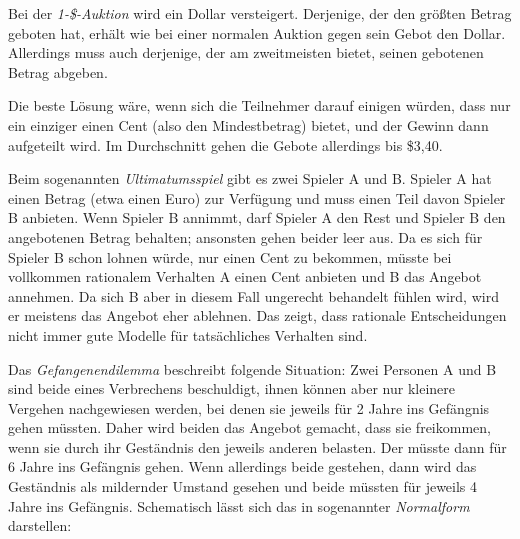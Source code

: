 \documentclass{zusammenfassung}
\begin{document}

Bei der \emph{1-\$-Auktion} wird ein Dollar versteigert. Derjenige, der den größten Betrag geboten hat, erhält wie bei einer 
normalen Auktion gegen sein Gebot den Dollar. Allerdings muss auch derjenige, der am zweitmeisten bietet, seinen gebotenen Betrag 
abgeben.

Die beste Lösung wäre, wenn sich die Teilnehmer darauf einigen würden, dass nur ein einziger einen Cent (also den Mindestbetrag)
bietet, und der Gewinn dann aufgeteilt wird. Im Durchschnitt gehen die Gebote allerdings bis \$3,40.

Beim sogenannten \emph{Ultimatumsspiel} gibt es zwei Spieler A und B. Spieler A hat einen Betrag (etwa einen Euro) zur Verfügung
und muss einen Teil davon Spieler B anbieten. Wenn Spieler B annimmt, darf Spieler A den Rest und Spieler B den angebotenen Betrag
behalten; ansonsten gehen beider leer aus. Da es sich für Spieler B schon lohnen würde, nur einen Cent zu bekommen, müsste bei
vollkommen rationalem Verhalten A einen Cent anbieten und B das Angebot annehmen. Da sich B aber in diesem Fall ungerecht
behandelt fühlen wird, wird er meistens das Angebot eher ablehnen. Das zeigt, dass rationale Entscheidungen nicht immer gute
Modelle für tatsächliches Verhalten sind.

Das \emph{Gefangenendilemma} beschreibt folgende Situation: Zwei Personen A und B sind beide eines Verbrechens beschuldigt, ihnen
können aber nur kleinere Vergehen nachgewiesen werden, bei denen sie jeweils für 2 Jahre ins Gefängnis gehen müssten. Daher wird
beiden das Angebot gemacht, dass sie freikommen, wenn sie durch ihr Geständnis den jeweils anderen belasten. Der müsste dann für 6
Jahre ins Gefängnis gehen. Wenn allerdings beide gestehen, dann wird das Geständnis als mildernder Umstand gesehen und beide
müssten für jeweils 4 Jahre ins Gefängnis. Schematisch lässt sich das in sogenannter \emph{Normalform} darstellen:

\begin{center}
\end{center}
\end{document}

